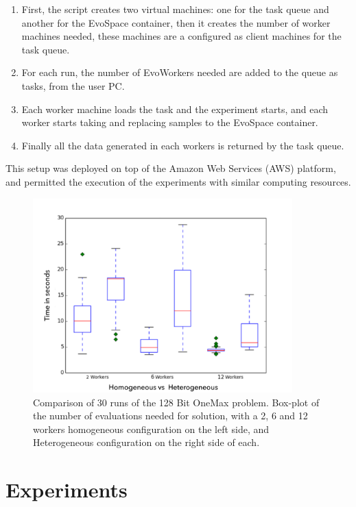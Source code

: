 \documentclass{llncs}
\begin{document}
\begin{enumerate}
    \item First, the script creates two virtual machines: one for the task queue and another
    for the EvoSpace container, then it creates the number of worker machines needed, these 
    machines are a configured as client machines for the task queue. 
    \item For each run, the number of EvoWorkers needed are added to the queue as tasks, from
    the user PC.
    \item Each worker machine loads the task and the experiment starts, and each worker
    starts taking and replacing samples to the EvoSpace container.
    \item Finally all the data generated in each workers is returned by the task queue. 
\end{enumerate}
This setup was deployed on top of the Amazon Web Services (AWS) platform, and permitted the 
execution of the experiments with similar computing resources.  

\begin{figure}[t]
    \centering
        \includegraphics[width=10cm]{img/one_max_comp.png}
    \caption{Comparison of 30 runs of the 128 Bit OneMax problem. 
    Box-plot of the number of evaluations needed for solution, with a 2, 6 and 12 workers
    homogeneous configuration on the left side, and Heterogeneous configuration on the
    right side of each.
    }
    \label{fig:comp-onemax}
\end{figure}

\section{Experiments}
 \label{sec:experiments}
\end{document}

